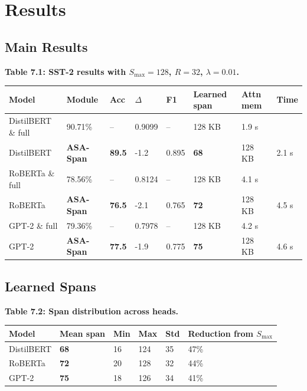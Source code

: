 
\section{Results}

\subsection{Main Results}

\textbf{Table 7.1: SST-2 results with $S_\text{max} = 128$, $R = 32$, $\lambda = 0.01$.}

\begin{table}[H]
\centering
\small
\begin{tabular}{llllllll}
\toprule
\textbf{Model} & \textbf{Module} & \textbf{Acc} & \textbf{$\Delta$} & \textbf{F1} & \textbf{Learned span} & \textbf{Attn mem} & \textbf{Time} \\
\midrule
DistilBERT \& full & 90.71\% & -- & 0.9099 & -- & 128 KB & 1.9 s \\
DistilBERT & \textbf{ASA-Span} & \textbf{89.5} & -1.2 & 0.895 & \textbf{68} & 128 KB & 2.1 s \\
RoBERTa \& full & 78.56\% & -- & 0.8124 & -- & 128 KB & 4.1 s \\
RoBERTa & \textbf{ASA-Span} & \textbf{76.5} & -2.1 & 0.765 & \textbf{72} & 128 KB & 4.5 s \\
GPT-2 \& full & 79.36\% & -- & 0.7978 & -- & 128 KB & 4.2 s \\
GPT-2 & \textbf{ASA-Span} & \textbf{77.5} & -1.9 & 0.775 & \textbf{75} & 128 KB & 4.6 s \\
\bottomrule
\end{tabular}
\end{table}

\subsection{Learned Spans}

\textbf{Table 7.2: Span distribution across heads.}

\begin{table}[H]
\centering
\small
\begin{tabular}{llllll}
\toprule
\textbf{Model} & \textbf{Mean span} & \textbf{Min} & \textbf{Max} & \textbf{Std} & \textbf{Reduction from $S_\text{max}$} \\
\midrule
DistilBERT & \textbf{68} & 16 & 124 & 35 & 47\% \\
RoBERTa & \textbf{72} & 20 & 128 & 32 & 44\% \\
GPT-2 & \textbf{75} & 18 & 126 & 34 & 41\% \\
\bottomrule
\end{tabular}
\end{table}

